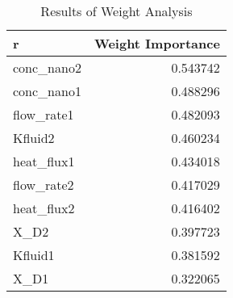 
    \begin{table*}
        \centering
        \begin{tabular}{p{12cm}r}r}
\hline
\hline
 Feature     &   Weight Importance \\
\hline
 conc\_nano2 &            0.543742 \\
 conc\_nano1 &            0.488296 \\
 flow\_rate1 &            0.482093 \\
 Kfluid2     &            0.460234 \\
 heat\_flux1 &            0.434018 \\
 flow\_rate2 &            0.417029 \\
 heat\_flux2 &            0.416402 \\
 X\_D2       &            0.397723 \\
 Kfluid1     &            0.381592 \\
 X\_D1       &            0.322065 \\
\hline
\end{tabular}
\hline
        \caption{Results of Weight Analysis}
        \label{weight_analysis}
    \end{table*}
    
